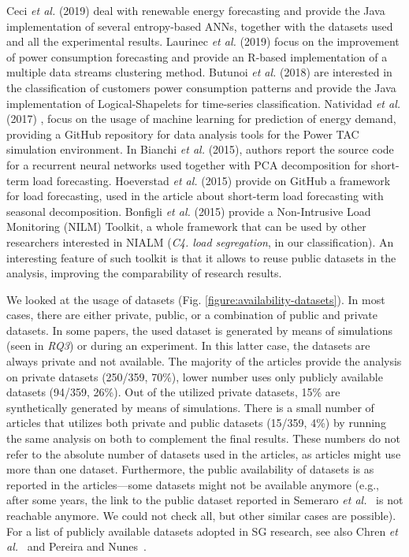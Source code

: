 \documentclass[journal]{IEEEtran}
\begin{document}
Ceci \textit{et al.} (2019)  deal with renewable energy forecasting and provide the Java implementation of several entropy-based ANNs, together with the datasets used and all the experimental results. Laurinec \textit{et al.} (2019)  focus on the improvement of power consumption forecasting and provide an R-based implementation of a multiple data streams clustering method. Butunoi \textit{et al.} (2018)  are interested in the classification of customers power consumption patterns and provide the Java implementation of Logical-Shapelets for time-series classification.
Natividad \textit{et al.} (2017) , focus on the usage of machine learning for prediction of energy demand, providing a GitHub repository for data analysis tools for the Power TAC simulation environment.
In Bianchi \textit{et al.} (2015), authors report the source code for a recurrent
neural networks \cite{ref:ScardapaneNN2015} used together with PCA decomposition for short-term load forecasting.  Hoeverstad \textit{et al.} (2015)  provide on GitHub a framework for load forecasting, used in the article about short-term load forecasting with seasonal decomposition.
Bonfigli \textit{et al.} (2015)  provide a Non-Intrusive Load Monitoring (NILM) Toolkit, a whole framework that can be used by other researchers interested in NIALM (\textit{C4. load segregation}, in our classification). An interesting feature of such toolkit is that it allows to reuse public datasets in the analysis, improving the comparability of research results. 


We looked at the usage of datasets (Fig. \ref{figure:availability-datasets}). In most cases, there are either private, public, or a combination of public and private datasets. In some papers, the used dataset is generated by means of simulations (seen in \textit{RQ3}) or during an experiment. In this latter case, the datasets are always private and not available. 
The majority of the articles  provide the analysis on private datasets (250/359, 70\%), lower number uses only publicly available datasets (94/359, 26\%). Out of the utilized private datasets, 15\% are synthetically generated by means of simulations. There is a small number of articles that utilizes both private and public datasets (15/359, 4\%) by running the same analysis on both to complement the final results.  These numbers do not refer to the absolute number of datasets used in the articles, as articles might use more than one dataset. Furthermore, the public availability of datasets is as reported in the articles---some datasets might not be available anymore (e.g., after some years, the link to the public dataset reported in Semeraro \textit{et al.}~ is not reachable anymore. We could not check all, but other similar cases are possible). For a list of publicly available datasets adopted in SG research, see also Chren \textit{et al.}~\cite{ref:chren2018SCSP} and Pereira and Nunes~\cite{ref:pereira2018performance}.
\end{document}
